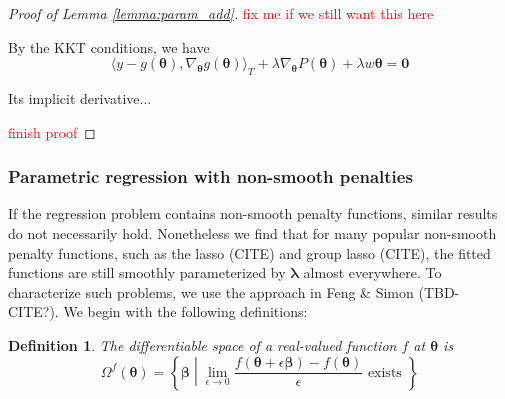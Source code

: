 \documentclass[12pt]{article}
\newtheorem{definition}{Definition}
\begin{document}
\begin{proof}[Proof of Lemma \ref{lemma:param_add}]
	\textcolor{red}{fix me if we still want this here}
	
	By the KKT conditions, we have
	\[
	\langle y-g\left( \boldsymbol{\theta} \right ),\nabla_{\boldsymbol{\theta}} g\left( \boldsymbol{\theta} \right ) \rangle_{T}
	+ \lambda \nabla_{\boldsymbol{\theta}} P(\boldsymbol{\theta})
	+\lambda w \boldsymbol{\theta} =\boldsymbol{0}
	\]
	
	
	Its implicit derivative...
	
%	
\textcolor{red}{finish proof}
\end{proof}

\subsubsection{Parametric regression with non-smooth penalties}

If the regression problem contains non-smooth penalty functions, similar results do not necessarily hold. Nonetheless we find that for many popular non-smooth penalty functions, such as the lasso (CITE) and group lasso (CITE), the fitted functions are still smoothly parameterized by $\boldsymbol \lambda$ almost everywhere. To characterize such problems, we use the approach in Feng \& Simon (TBD- CITE?). We begin with the following definitions:

\begin{definition}
	The differentiable space of a real-valued function $f$ at $\boldsymbol{\theta}$ is
	\begin{equation}
	\Omega^{f}(\boldsymbol{\theta}) = \left \{ \boldsymbol{\beta} \middle | \lim_{\epsilon \rightarrow 0} \frac{f(\boldsymbol{\theta} + \epsilon \boldsymbol{\beta}) - f(\boldsymbol{\theta})}{\epsilon} \text{ exists } \right \}
	\end{equation}
\end{definition}
\end{document}
